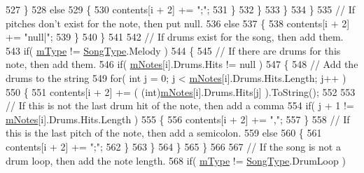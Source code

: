 \begin{DoxyCode}
527                             \}
528                             \textcolor{keywordflow}{else}
529                             \{
530                                 contents[i + 2] += \textcolor{stringliteral}{";"};
531                             \}
532                         \}
533                     \}
534                 \}
535                 \textcolor{comment}{// If pitches don't exist for the note, then put null.}
536                 \textcolor{keywordflow}{else}
537                 \{
538                     contents[i + 2] += \textcolor{stringliteral}{"null|"};
539                 \}
540             \}
541 
542             \textcolor{comment}{// If drums exist for the song, then add them.}
543             \textcolor{keywordflow}{if}( \hyperlink{group___song_priv_var_gaf3b9d0f461522324f897b746311b43c5}{mType} != \hyperlink{group___song_enums_gae681a1f001333e39fc1cb4fea97bfe1b}{SongType}.Melody )
544             \{
545                 \textcolor{comment}{// If there are drums for this note, then add them. }
546                 \textcolor{keywordflow}{if}( \hyperlink{group___song_priv_var_ga674bc904a1f856d485d5fb7fe84bac85}{mNotes}[i].Drums.Hits != null )
547                 \{
548                     \textcolor{comment}{// Add the drums to the string}
549                     \textcolor{keywordflow}{for}( \textcolor{keywordtype}{int} j = 0; j < \hyperlink{group___song_priv_var_ga674bc904a1f856d485d5fb7fe84bac85}{mNotes}[i].Drums.Hits.Length; j++ )
550                     \{
551                         contents[i + 2] += ( (int)\hyperlink{group___song_priv_var_ga674bc904a1f856d485d5fb7fe84bac85}{mNotes}[i].Drums.Hits[j] ).ToString();
552 
553                         \textcolor{comment}{// If this is not the last drum hit of the note, then add a comma}
554                         \textcolor{keywordflow}{if}( j + 1 != \hyperlink{group___song_priv_var_ga674bc904a1f856d485d5fb7fe84bac85}{mNotes}[i].Drums.Hits.Length )
555                         \{
556                             contents[i + 2] += \textcolor{stringliteral}{","};
557                         \}
558                         \textcolor{comment}{// If this is the last pitch of the note, then add a semicolon.}
559                         \textcolor{keywordflow}{else}
560                         \{
561                             contents[i + 2] += \textcolor{stringliteral}{";"};
562                         \}
563                     \}
564                 \}
565             \}
566 
567             \textcolor{comment}{// If the song is not a drum loop, then add the note length.}
568             \textcolor{keywordflow}{if}( \hyperlink{group___song_priv_var_gaf3b9d0f461522324f897b746311b43c5}{mType} != \hyperlink{group___song_enums_gae681a1f001333e39fc1cb4fea97bfe1b}{SongType}.DrumLoop )

\end{DoxyCode}
